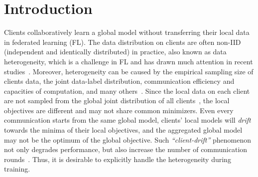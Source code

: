 \documentclass{article} %
\begin{document}
\section{Introduction}
Clients collaboratively learn a global model without transferring their local data in federated learning (FL). The data distribution on clients are often non-IID (independent and identically distributed) in practice, also known as data heterogeneity, which is a challenge in FL and has drawn much attention
in recent studies~\citep{karimireddy2019scaffold, wang2020tackling,wang2021field}. 
Moreover, heterogeneity can be caused by the empirical sampling size of clients data, the joint data-label distribution, communication efficiency  and capacities of computation, and many others~\citep{kairouz2019advances}.
Since the local data on each client are not sampled from the global joint distribution of all clients~\citep{li2019convergence}, the local objectives are different and may not share common minimizers.
Even every communication starts from the same global model, clients' local models will \textit{drift} towards the minima of their local objectives, and the aggregated global model may not be the optimum of the global objective.
Such {\em ``client-drift''} phenomenon not only degrades performance, but also increase the number of communication rounds~\citep{karimireddy2019scaffold}. 
Thus, it is desirable to explicitly handle the heterogeneity during training.
\end{document}
